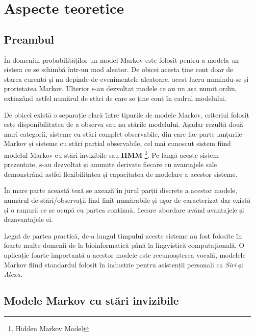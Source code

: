 \chapter{Aspecte teoretice}

\section{Preambul}

În domeniul probabilităților un model Markov este folosit pentru a modela un sistem ce se schimbă într-un mod aleator. De obicei acesta ține cont doar de starea curentă și nu depinde de evenimentele aleatoare, acest lucru numindu-se și prorietatea Markov. Ulterior s-au dezvoltat modele ce au un așa numit ordin, extinzând astfel numărul de stări de care se ține cont în cadrul modelului.\par

De obicei există o separație clară între tipurile de modele Markov, criteriul folosit este disponibilitatea de a observa sau nu stările modelului. Așadar rezultă două mari categorii, sisteme cu stări complet observabile, din care fac parte lanțurile Markov și sisteme cu stări parțial observabile, cel mai cunoscut sistem fiind modelul Markov cu stări invizibile sau \textbf{HMM} \footnote{Hidden Markov Model}. Pe langă aceste sistem prezentate, s-au dezvoltat și anumite derivate fiecare cu avantajele sale demonstrând astfel flexibilitatea și capacitatea de modelare a acestor sisteme.\par

În mare parte această teză se axează în jurul parții discrete a acestor modele, numărul de stări/observații find finit numărabile și ușor de caracterizat dar există și o ramură ce se ocupă cu partea continuă, fiecare abordare avănd avantajele și dezavantajele ei.\par

Legat de partea practică, de-a lungul timpului aceste sisteme au fost folosite în foarte multe domenii de la bioinformatică până la lingvistică computațională. O aplicație foarte importantă a acestor modele este recunoașterea vocală, modelele Markov fiind standardul folosit în industrie pentru asistenții personali ca \textit{Siri} și \textit{Alexa}.\par

\section{Modele Markov cu stări invizibile}

